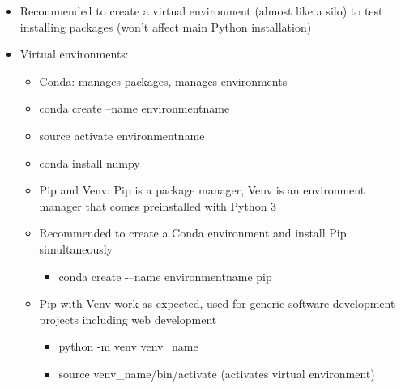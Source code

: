 \begin{itemize}
	\item Recommended to create a virtual environment (almost like a silo) to test installing packages (won't affect main Python installation)
	\item Virtual environments:
	\begin{itemize}
		\item Conda: manages packages, manages environments
		\item conda create --name environmentname
		\item source activate environmentname
		\item conda install numpy
		\item Pip and Venv: Pip is a package manager, Venv is an environment manager that comes preinstalled with Python 3
		\item Recommended to create a Conda environment and install Pip simultaneously
		\begin{itemize}
			\item conda create -–name environmentname pip
		\end{itemize}
		\item Pip with Venv work as expected, used for generic software development projects including web development
		\begin{itemize}
			\item python -m venv venv\_name
			\item source venv\_name/bin/activate (activates virtual environment)
		\end{itemize}
	\end{itemize}
\end{itemize}










